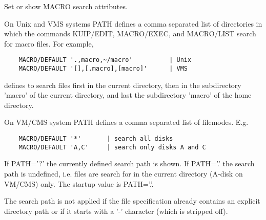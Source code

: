 \ENDCMD


\BEGARG
{}
\ENDARG
{}
\ENDOPT

   \par
Set or show MACRO search attributes.  

   \par
On Unix and VMS systems PATH defines a comma separated list of directories 
   in which the commands KUIP/EDIT, MACRO/EXEC, and MACRO/LIST search for 
   macro files.  For example, 
\begin{verbatim}
    MACRO/DEFAULT '.,macro,~/macro'          | Unix
    MACRO/DEFAULT '[],[.macro],[macro]'      | VMS
\end{verbatim}
   \par
defines to search files first in the current directory, then in the 
   subdirectory 'macro' of the current directory, and last the subdirectory 
   'macro' of the home directory.  

   \par
On VM/CMS system PATH defines a comma separated list of filemodes.  E.g.  
\begin{verbatim}
    MACRO/DEFAULT '*'       | search all disks
    MACRO/DEFAULT 'A,C'     | search only disks A and C
\end{verbatim}
\ENDVERB
   \par
If PATH='?' the currently defined search path is shown.  If PATH='.' the 
   search path is undefined, i.e. files are search for in the current 
   directory (A-disk on VM/CMS) only.  The startup value is PATH='.'.  

   \par
The search path is not applied if the file specification already contains 
   an explicit directory path or if it starts with a '-' character (which is 
   stripped off).  

